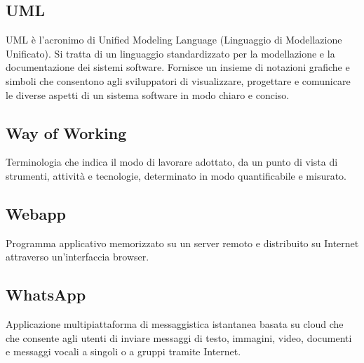 \subsection{UML}UML è l'acronimo di Unified Modeling Language (Linguaggio di Modellazione Unificato). Si tratta di un linguaggio standardizzato per la modellazione e la documentazione dei sistemi software. Fornisce un insieme di notazioni grafiche e simboli che consentono agli sviluppatori di visualizzare, progettare e comunicare le diverse aspetti di un sistema software in modo chiaro e conciso.
\subsection{Way of Working}Terminologia che indica il modo di lavorare adottato, da un punto di vista di strumenti, attività e tecnologie, determinato in modo quantificabile e misurato.
\subsection{Webapp}Programma applicativo memorizzato su un server remoto e distribuito su Internet attraverso un'interfaccia browser.
\subsection{WhatsApp}Applicazione multipiattaforma di messaggistica istantanea basata su cloud che che consente agli utenti di inviare messaggi di testo, immagini, video, documenti e messaggi vocali a singoli o a gruppi tramite Internet.
